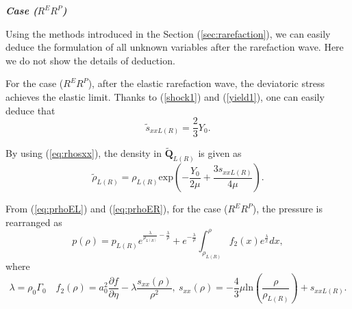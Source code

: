 \documentclass{article}
\numberwithin{equation}{section}
\numberwithin{table}{section}
\begin{document}

	\emph{\textbf{Case ($R^{E}R^{P}$)}}

Using the methods introduced in  the Section (\ref{sec:rarefaction}), we can easily deduce the formulation of all unknown variables after the rarefaction wave. Here we do not show the details of deduction.


For the case ($R^{E}R^{P}$),  after the elastic rarefaction wave, the deviatoric stress achieves the elastic limit. Thanks to (\ref{shock1}) and (\ref{yield1}), one can easily deduce that
\begin{equation*}
\tilde{s}_{xxL(R)} = \frac{2}{3}Y_0.
\end{equation*}

By using (\ref{eq:rhosxx}), the density in $\tilde{\mathbf{Q}}_{L(R)}$ is given as
\begin{equation*}
\tilde{\rho}_{L(R)} = \rho_{L(R)} \text{exp}\left(-\frac{Y_0}{2\mu}+\frac{3 s_{xxL(R)}}{4\mu}\right).
\end{equation*}

From (\ref{eq:prhoEL}) and (\ref{eq:prhoER}), for the case ($R^{E}R^{P}$), the pressure is rearranged as
\begin{equation}\label{rerpp}
  p(\rho)=
	  p_{L(R)}e^{\frac{\lambda}{\rho_{L(R)}}-\frac{\lambda}{\rho}} +e^{-\frac{\lambda}{\rho}}\int_{\rho_{L(R)}}^{\rho} f_2(x) e^{\frac{\lambda}{x}}dx, %
\end{equation}
where
\begin{equation}
  \lambda = \rho_0 \Gamma_0 \quad f_2(\rho) = a_0^2\frac{\partial f}{\partial \eta}- \lambda\frac{s_{xx}(\rho)}{\rho^2}, \ s_{xx}(\rho) =	 -\frac{4}{3}\mu\text{ln}\left(\frac{\rho}{\rho_{L(R)}}\right)+s_{xxL(R)}.
\end{equation}
\end{document}
